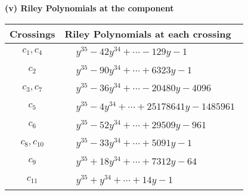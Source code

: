 \documentclass[1p]{elsarticle_modified}
\theoremstyle{definition}
\begin{document}
\newpage\renewcommand{\arraystretch}{1}
\flushleft \textbf{(v) Riley Polynomials at the component}\newline \\
\begin{tabular}{m{50pt}|m{274pt}}
Crossings & \hspace{64pt}Riley Polynomials at each crossing \\
\hline $$\begin{aligned}c_{1},c_{4}\end{aligned}$$&$\begin{aligned}
&y^{35}-42 y^{34}+\cdots-129 y-1
\end{aligned}$\\
\hline $$\begin{aligned}c_{2}\end{aligned}$$&$\begin{aligned}
&y^{35}-90 y^{34}+\cdots+6323 y-1
\end{aligned}$\\
\hline $$\begin{aligned}c_{3},c_{7}\end{aligned}$$&$\begin{aligned}
&y^{35}-36 y^{34}+\cdots-20480 y-4096
\end{aligned}$\\
\hline $$\begin{aligned}c_{5}\end{aligned}$$&$\begin{aligned}
&y^{35}-4 y^{34}+\cdots+25178641 y-1485961
\end{aligned}$\\
\hline $$\begin{aligned}c_{6}\end{aligned}$$&$\begin{aligned}
&y^{35}-52 y^{34}+\cdots+29509 y-961
\end{aligned}$\\
\hline $$\begin{aligned}c_{8},c_{10}\end{aligned}$$&$\begin{aligned}
&y^{35}-33 y^{34}+\cdots+5091 y-1
\end{aligned}$\\
\hline $$\begin{aligned}c_{9}\end{aligned}$$&$\begin{aligned}
&y^{35}+18 y^{34}+\cdots+7312 y-64
\end{aligned}$\\
\hline $$\begin{aligned}c_{11}\end{aligned}$$&$\begin{aligned}
&y^{35}+y^{34}+\cdots+14 y-1
\end{aligned}$\\
\hline
\end{tabular}\\~\\
\end{document}
